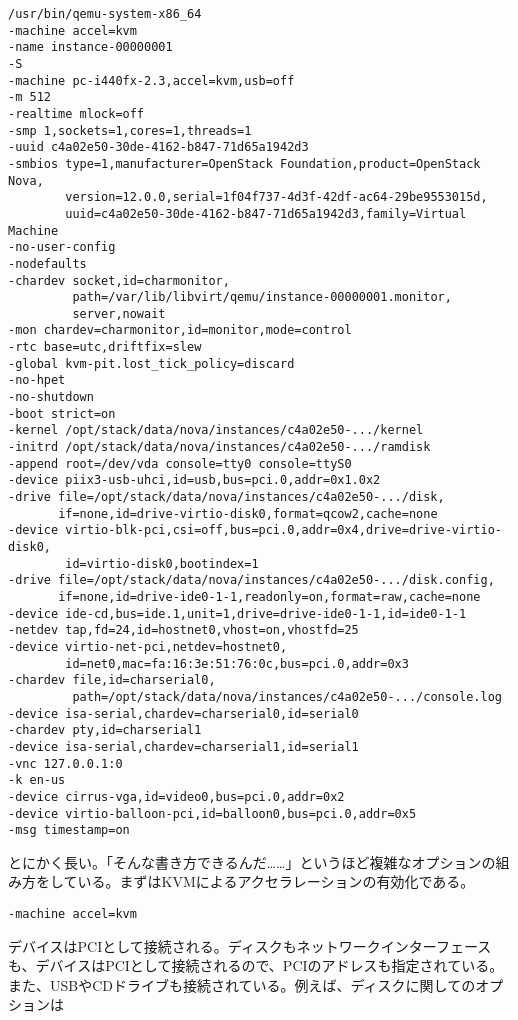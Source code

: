 \documentclass[9pt,b5paper,tombo]{jsbook}
\begin{document}
\begin{lstlisting}
/usr/bin/qemu-system-x86_64
-machine accel=kvm
-name instance-00000001
-S
-machine pc-i440fx-2.3,accel=kvm,usb=off
-m 512
-realtime mlock=off
-smp 1,sockets=1,cores=1,threads=1
-uuid c4a02e50-30de-4162-b847-71d65a1942d3
-smbios type=1,manufacturer=OpenStack Foundation,product=OpenStack Nova,
        version=12.0.0,serial=1f04f737-4d3f-42df-ac64-29be9553015d,
        uuid=c4a02e50-30de-4162-b847-71d65a1942d3,family=Virtual Machine
-no-user-config
-nodefaults
-chardev socket,id=charmonitor,
         path=/var/lib/libvirt/qemu/instance-00000001.monitor,
         server,nowait
-mon chardev=charmonitor,id=monitor,mode=control
-rtc base=utc,driftfix=slew
-global kvm-pit.lost_tick_policy=discard
-no-hpet
-no-shutdown
-boot strict=on
-kernel /opt/stack/data/nova/instances/c4a02e50-.../kernel
-initrd /opt/stack/data/nova/instances/c4a02e50-.../ramdisk
-append root=/dev/vda console=tty0 console=ttyS0
-device piix3-usb-uhci,id=usb,bus=pci.0,addr=0x1.0x2
-drive file=/opt/stack/data/nova/instances/c4a02e50-.../disk,
       if=none,id=drive-virtio-disk0,format=qcow2,cache=none
-device virtio-blk-pci,csi=off,bus=pci.0,addr=0x4,drive=drive-virtio-disk0,
        id=virtio-disk0,bootindex=1
-drive file=/opt/stack/data/nova/instances/c4a02e50-.../disk.config,
       if=none,id=drive-ide0-1-1,readonly=on,format=raw,cache=none
-device ide-cd,bus=ide.1,unit=1,drive=drive-ide0-1-1,id=ide0-1-1
-netdev tap,fd=24,id=hostnet0,vhost=on,vhostfd=25
-device virtio-net-pci,netdev=hostnet0,
        id=net0,mac=fa:16:3e:51:76:0c,bus=pci.0,addr=0x3
-chardev file,id=charserial0,
         path=/opt/stack/data/nova/instances/c4a02e50-.../console.log
-device isa-serial,chardev=charserial0,id=serial0
-chardev pty,id=charserial1
-device isa-serial,chardev=charserial1,id=serial1
-vnc 127.0.0.1:0
-k en-us
-device cirrus-vga,id=video0,bus=pci.0,addr=0x2
-device virtio-balloon-pci,id=balloon0,bus=pci.0,addr=0x5
-msg timestamp=on
\end{lstlisting}

とにかく長い。「そんな書き方できるんだ……」というほど複雑なオプションの組み方をしている。まずはKVMによるアクセラレーションの有効化である。

\begin{lstlisting}
-machine accel=kvm
\end{lstlisting}

デバイスはPCIとして接続される。ディスクもネットワークインターフェースも、デバイスはPCIとして接続されるので、PCIのアドレスも指定されている。また、USBやCDドライブも接続されている。例えば、ディスクに関してのオプションは
\end{document}
